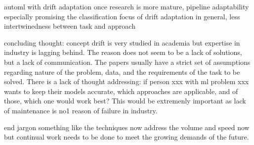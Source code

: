  automl with drift adaptation once research is more mature, pipeline adaptability especially promising
 the classification focus of drift adaptation in general, less intertwinedness between task and approach
 
 concluding thought: concept drift is very studied in academia but expertise in industry is lagging behind. The reason does not seem to be a lack of solutions, but a lack of communication. The papers usually have a strict set of assumptions regarding nature of the problem, data, and the requirements of the task to be solved. There is a lack of thought addressing: if person xxx with ml problem xxx wants to keep their models accurate, which approaches are applicable, and of those, which one would work best? This would be extremenly important as lack of maintenance is no1 reason of failure in industry.
 
 end jargon something like the techniques now address the volume and speed now but continual work needs to be done to meet the growing demands of the future.
